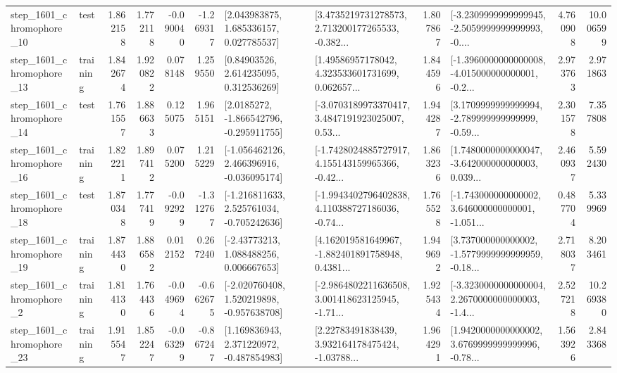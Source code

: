 \begin{tabular}{llrrrrllrlrr}
 step\_1601\_chromophore\_10 &      test &      1.862158 &    1.772118 &     -0.090040 & -1.269317 &     [2.043983875, 1.685336157, 0.027785537] &  [3.4735219731278573, 2.713200177265533, -0.382... &       1.807867 &  [-3.2309999999999945, -2.5059999999999993, -0.... &            4.760908 &         10.006599 \\
 step\_1601\_chromophore\_13 &  training &      1.842674 &    1.920822 &      0.078148 &  1.259550 &      [0.84903526, 2.614235095, 0.312536269] &  [1.49586957178042, 4.323533601731699, 0.062657... &       1.844596 &  [-1.3960000000000008, -4.015000000000001, -0.2... &            2.973763 &          2.971863 \\
 step\_1601\_chromophore\_14 &      test &      1.761557 &    1.886633 &      0.125075 &  1.965151 &     [2.0185272, -1.866542796, -0.295911755] &  [-3.0703189973370417, 3.4847191923025007, 0.53... &       1.944287 &  [3.1709999999999994, -2.789999999999999, -0.59... &            2.301578 &          7.357808 \\
 step\_1601\_chromophore\_16 &  training &      1.822211 &    1.897412 &      0.075200 &  1.215229 &   [-1.056462126, 2.466396916, -0.036095174] &  [-1.7428024885727917, 4.155143159965366, -0.42... &       1.863236 &  [1.7480000000000047, -3.642000000000003, 0.039... &            2.460937 &          5.592430 \\
 step\_1601\_chromophore\_18 &      test &      1.870348 &    1.777419 &     -0.092929 & -1.312767 &   [-1.216811633, 2.525761034, -0.705242636] &  [-1.9943402796402838, 4.110388727186036, -0.74... &       1.765528 &  [-1.743000000000002, 3.646000000000001, -1.051... &            0.487704 &          5.339969 \\
 step\_1601\_chromophore\_19 &  training &      1.874430 &    1.886582 &      0.012152 &  0.267240 &     [-2.43773213, 1.088488256, 0.006667653] &  [4.162019581649967, -1.882401891758948, 0.4381... &       1.949692 &  [3.737000000000002, -1.5779999999999959, -0.18... &            2.718037 &          8.203461 \\
  step\_1601\_chromophore\_2 &  training &      1.814130 &    1.764436 &     -0.049694 & -0.662675 &   [-2.020760408, 1.520219898, -0.957638708] &  [-2.9864802211636508, 3.001418623125945, -1.71... &       1.925434 &  [-3.3230000000000004, 2.2670000000000003, -1.4... &            2.527218 &         10.269380 \\
 step\_1601\_chromophore\_23 &  training &      1.915547 &    1.852247 &     -0.063299 & -0.867247 &    [1.169836943, 2.371220972, -0.487854983] &  [2.22783491838439, 3.932164178475424, -1.03788... &       1.964291 &  [1.9420000000000002, 3.6769999999999996, -0.78... &            1.563926 &          2.843368 \\

\end{tabular}
